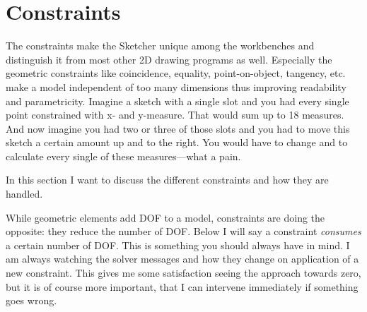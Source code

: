 \documentclass[12pt,titlepage]{article}
\let\partOrigin\part
\renewcommand\part{\newpage\partOrigin}
\begin{document}
\newpage

\part{Constraints}
\label{Constraints}
The constraints make the Sketcher unique among the workbenches and
distinguish it from most other 2D drawing programs as well. Especially the geometric
constraints like coincidence, equality, point-on-object, tangency, etc. make a model
independent of too many dimensions thus improving readability and parametricity.
Imagine a sketch with a single slot and you had every single point constrained with
x- and y-measure. That would sum up to 18 measures. And now imagine you had two or
three of those slots and you had to move this sketch a certain amount up and to the
right. You would have to change and to calculate every single of these measures---what a pain.

In this section I want to discuss the different constraints and how they are handled.

While geometric elements add DOF to a model, constraints are doing the opposite: they
reduce the number of DOF. Below I will say a constraint \emph{consumes} a
certain number of DOF. This is something you should always have in mind. I am
always watching the solver messages and how they change on application of a new
constraint. This gives me some satisfaction seeing the approach towards zero, but
it is of course more important, that I can intervene immediately if something goes wrong.
\end{document}
